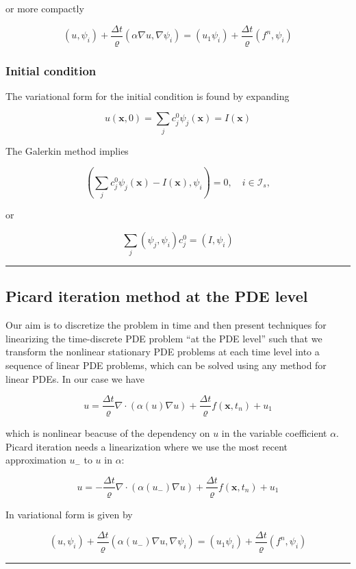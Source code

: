 \documentclass[letterpaper,10pt,english]{/usr/share/sphinx/texinputs/sphinxhowto}
\begin{document}
or more compactly

\[
(u,{\psi}_i) + \frac{\Delta t}{\varrho} ({\alpha}\nabla u,\nabla{\psi}_i)
= (u_1{\psi}_i) + \frac{\Delta t}{\varrho} (f^n,{\psi}_i)
\]

\subsubsection{Initial condition}

The variational form for the initial condition is found by expanding

\[
u(\pmb{x},0) = \sum_j c_j^0 \psi_j(\pmb{x}) = I(\pmb{x})
\]

The Galerkin method implies

\[
\left(\sum_j c_j^0 \psi_j(\pmb{x}) - I(\pmb{x}),{\psi}_i \right)=0,\quad i\in{\mathcal{I}_s},
\]

or

\[
\sum_j (\psi_j, {\psi}_i) c_j^0 =  (I,{\psi}_i)
\]\begin{center}\rule{3in}{0.4pt}\end{center}

\subsection{Picard iteration method at the PDE level}

Our aim is to discretize the problem in time and then present techniques
for linearizing the time-discrete PDE problem ``at the PDE level'' such
that we transform the nonlinear stationary PDE problems at each time
level into a sequence of linear PDE problems, which can be solved using
any method for linear PDEs. In our case we have

\[
u = \frac{\Delta t}{\varrho}\nabla\cdot({\alpha}(u)\nabla u) +\frac{\Delta t}{\varrho} f(\boldsymbol{x}, t_{n}) + u_1
\]

which is nonlinear beacuse of the dependency on $u$ in the variable
coefficient $\alpha$. Picard iteration needs a linearization where we
use the most recent approximation $u_-$ to $u$ in $\alpha$:

\[
u = -\frac{\Delta t}{\varrho}\nabla\cdot({\alpha}(u_-)\nabla u) +\frac{\Delta t}{\varrho} f(\boldsymbol{x}, t_{n}) + u_1
\]

In variational form is given by

\[
(u,{\psi}_i) + \frac{\Delta t}{\varrho} ({\alpha(u_-)}\nabla u,\nabla{\psi}_i)
= (u_1{\psi}_i) + \frac{\Delta t}{\varrho} (f^n,{\psi}_i)
\]\begin{center}\rule{3in}{0.4pt}\end{center}
\end{document}
